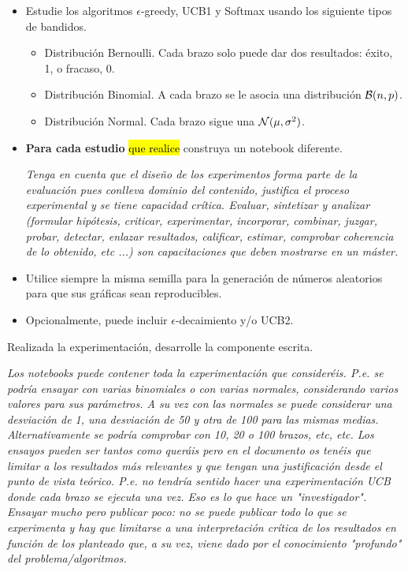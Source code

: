 \documentclass[a4paper, 11pt]{article}
\begin{document}
\begin{itemize}
\item Estudie los algoritmos $\epsilon$-greedy, UCB1 y Softmax   usando los siguiente tipos de bandidos. 

\begin{itemize}
\item Distribución Bernoulli. Cada brazo solo puede dar dos resultados: éxito, 1, o fracaso, 0.  

\item Distribución Binomial. A cada brazo se le asocia una distribución ${\cal B}(n,p)$. 

\item Distribución Normal. Cada brazo sigue una ${\cal N}(\mu, \sigma^2)$.
\end{itemize}

\item \textbf{\color{red}Para cada estudio} \hl{que realice} construya un notebook diferente.


\textit{Tenga en cuenta que el diseño de los experimentos forma parte de la evaluación pues conlleva dominio del contenido, justifica el proceso experimental y se tiene capacidad crítica. Evaluar, sintetizar y analizar (formular hipótesis, criticar, experimentar, incorporar, combinar, juzgar, probar, detectar, enlazar resultados, calificar, estimar, comprobar coherencia de lo obtenido, etc ...) son capacitaciones que deben mostrarse en un máster.}


\item Utilice siempre la misma semilla para la generación de números aleatorios para que sus gráficas sean reproducibles.

\item Opcionalmente, puede incluir $\epsilon$-decaimiento y/o UCB2.
\end{itemize}

Realizada la experimentación, desarrolle la componente escrita.


\textit{Los notebooks puede contener toda la experimentación que consideréis. P.e. se podría ensayar con varias binomiales o con varias normales, considerando varios valores para sus parámetros. A su vez con las normales se puede considerar una desviación de 1, una desviación de 50 y otra de 100 para las mismas medias. Alternativamente se podría comprobar con 10, 20 o 100 brazos, etc, etc.
Los ensayos pueden ser tantos como queráis pero en el documento os tenéis que limitar a los resultados más relevantes y que tengan una justificación desde el punto de vista teórico. P.e. no tendría sentido hacer una experimentación UCB donde cada brazo se ejecuta una vez. Eso es lo que hace un "{}investigador"{}. Ensayar mucho pero publicar poco: no se puede publicar todo lo que se experimenta y hay que limitarse a una interpretación crítica de los resultados en función de los planteado que, a su vez, viene dado por el conocimiento "profundo"{} del problema/algoritmos.}
\end{document}
